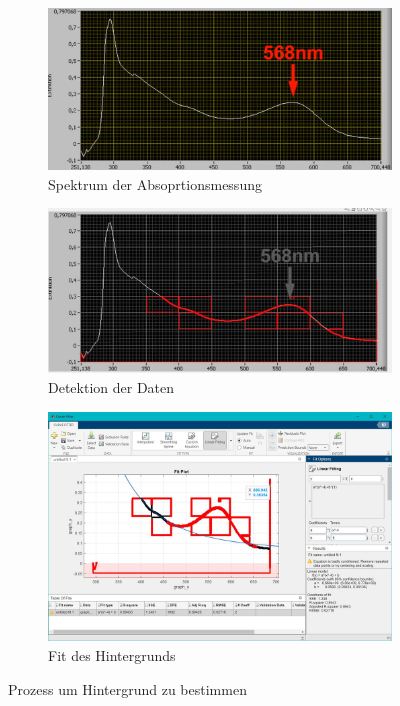 \begin{figure}[htbp]
    \centering
    
    \begin{subfigure}[b]{0.3\textwidth}
        \centering
        \includegraphics[width=\textwidth]{Spektrum.png}
        \caption{Spektrum der Absoprtionsmessung}
        \label{fig:Spektrum}
    \end{subfigure}
    \hfill
    \begin{subfigure}[b]{0.3\textwidth}
        \centering
        \includegraphics[width=\textwidth]{Data picture.JPG}
        \caption{Detektion der Daten}
        \label{fig:Datafind}
    \end{subfigure}
    \hfill
    \begin{subfigure}[b]{0.3\textwidth}
        \centering
        \includegraphics[width=\textwidth]{matlab fit.JPG}
        \caption{Fit des Hintergrunds}
        \label{fig:Fit}
    \end{subfigure}
    
    \caption{Prozess um Hintergrund zu bestimmen}
    \label{fig:Background}
\end{figure}

